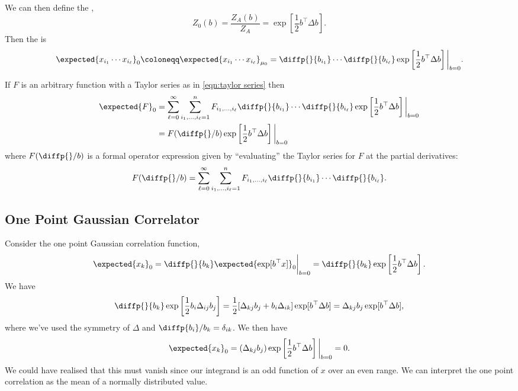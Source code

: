 \documentclass[fleqn]{NotesClass}
\newcommand{\trans}{{\top}}
\begin{document}
    We can then define the ,
    \begin{equation}
        Z_0(b) = \frac{Z_A(b)}{Z_A} = \exp\left[ \frac{1}{2} b^\trans \Delta b \right].
    \end{equation}
    Then the  is
    \begin{equation}
        \expected{x_{i_1} \dotsm x_{i_\ell}}_0 \coloneqq \expected{x_{i_1} \dotsm x_{i_\ell}}_{\mu_0} = \diffp{}{b_{i_1}} \dotsm \diffp{}{b_{i_\ell}} \exp\left[ \frac{1}{2}b^\trans \Delta b \right]\bigg|_{b = 0}.
    \end{equation}
    
    If \(F\) is an arbitrary function with a Taylor series as in \cref{eqn:taylor series} then
    \begin{align}
        \expected{F}_0 &= \sum_{\ell = 0}^{\infty} \sum_{i_1, \dotsc, i_\ell = 1}^{n} F_{i_1, \dotsc, i_{\ell}} \diffp{}{b_{i_1}} \dotsm \diffp{}{b_{i_{\ell}}} \exp\left[ \frac{1}{2} b^\trans \Delta b \right] \bigg|_{b = 0}\\
        &= F(\diffp{}/{b}) \exp\left[ \frac{1}{2} b^\trans \Delta b \right]\bigg|_{b = 0}
    \end{align}
    where \(F(\diffp{}/{b})\) is a formal operator expression given by \enquote{evaluating} the Taylor series for \(F\) at the partial derivatives:
    \begin{equation}
        F(\diffp{}/{b}) = \sum_{\ell = 0}^{\infty} \sum_{i_1, \dotsc, i_{\ell} = 1}^{n} F_{i_1, \dotsc, i_{\ell}} \diffp{}{b_{i_1}} \dotsm \diffp{}{b_{i_\ell}}.
    \end{equation}
    
    \subsection{One Point Gaussian Correlator}
    Consider the one point Gaussian correlation function,
    \begin{equation}
        \expected{x_k}_0 = \diffp{}{b_k} \expected{\exp[b^\trans x]}_0 \bigg|_{b = 0} = \diffp{}{b_k} \exp\left[ \frac{1}{2}b^\trans \Delta b \right].
    \end{equation}
    We have
    \begin{equation}
        \diffp{}{b_k} \exp\left[ \frac{1}{2}b_i\Delta_{ij}b_j \right] = \frac{1}{2}[\Delta_{kj}b_j + b_i\Delta_{ik}]\exp[b^\trans \Delta b] = \Delta_{kj}b_j \exp[b^\trans \Delta b],
    \end{equation}
    where we've used the symmetry of \(\Delta\) and \(\diffp{b_i}/{b_k} = \delta_{ik}\).
    We then have
    \begin{equation}
        \expected{x_k}_0 = (\Delta_{kj}b_j) \exp\left[ \frac{1}{2}b^\trans \Delta b \right]\bigg|_{b = 0} = 0.
    \end{equation}
    We could have realised that this must vanish since our integrand is an odd function of \(x\) over an even range.
    We can interpret the one point correlation as the mean of a normally distributed value.
    
\end{document}
